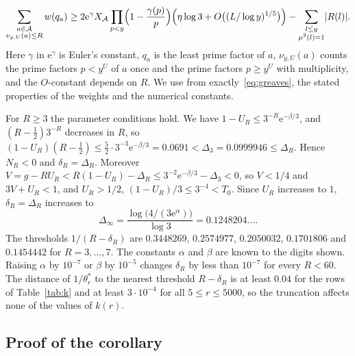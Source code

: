 \documentclass[11pt]{amsart}
\theoremstyle{definition}
\numberwithin{equation}{section}
\newcommand{\e}{\mathrm{e}}
\begin{document}
\begin{equation}\label{eq:greaves}
\sum_{\substack{a\in\mathcal A\\\nu_{y,U}(a)\le R}}w(q_a)\ge2\e^{\gamma}X_{\mathcal A}\prod_{p<y}\Bigl(1-\frac{\gamma(p)}p\Bigr)\Bigl(\eta\log3+O\bigl((L/\log y)^{1/5}\bigr)\Bigr)-\sum_{\substack{l\le y\\\mu^2(l)=1}}\lvert R(l)\rvert.
\end{equation}
Here $\gamma$ in $\e^{\gamma}$ is Euler's constant, $q_a$ is the least prime factor of $a$, $\nu_{y,U}(a)$ counts the prime factors $p<y^U$ of $a$ once and the prime factors $p\ge y^U$ with multiplicity, and the $O$-constant depends on $R$. We use from \cite{Gr82} exactly~\eqref{eq:greaves}, the stated properties of the weights and the numerical constants.

For $R\ge3$ the parameter conditions hold. We have $1-U_R\le3^{-R}\e^{-\beta/3}$, and $(R-\frac12)3^{-R}$ decreases in $R$, so $(1-U_R)(R-\frac12)\le\frac52\cdot3^{-3}\e^{-\beta/3}=0.0691<\Delta_3=0.0999946\le\Delta_R$. Hence $N_R<0$ and $\delta_R=\Delta_R$. Moreover $V=g-RU_R<R(1-U_R)-\Delta_R\le3^{-2}\e^{-\beta/3}-\Delta_3<0$, so $V<1/4$ and $3V+U_R<1$, and $U_R>1/2$, $(1-U_R)/3\le3^{-4}<T_0$. Since $U_R$ increases to $1$, $\delta_R=\Delta_R$ increases to
\[
\Delta_\infty=\frac{\log\bigl(4/(3\e^{\alpha})\bigr)}{\log3}=0.1248204\ldots.
\]
The thresholds $1/(R-\delta_R)$ are $0.3448269$, $0.2574977$, $0.2050032$, $0.1701806$ and $0.1454442$ for $R=3,\dots,7$. The constants $\alpha$ and $\beta$ are known to the digits shown. Raising $\alpha$ by $10^{-7}$ or $\beta$ by $10^{-5}$ changes $\delta_R$ by less than $10^{-7}$ for every $R<60$. The distance of $1/\theta^*_r$ to the nearest threshold $R-\delta_R$ is at least $0.04$ for the rows of Table~\ref{tab:k} and at least $3\cdot10^{-4}$ for all $5\le r\le5000$, so the truncation affects none of the values of $k(r)$.

\subsection{Proof of the corollary}
\end{document}
